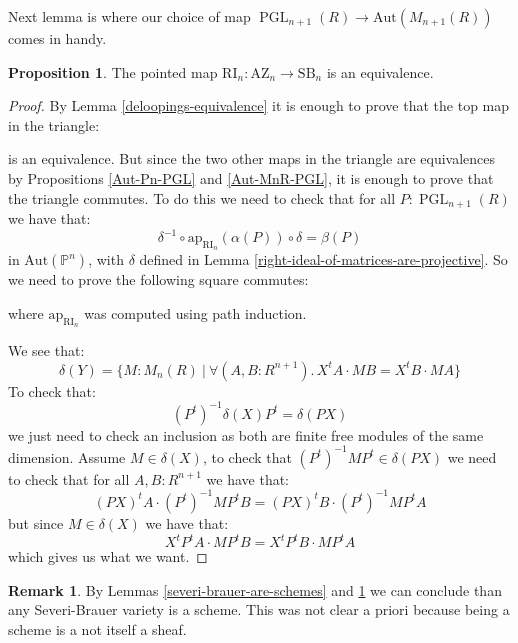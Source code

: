 \documentclass[10pt,a4paper]{article}
\theoremstyle{definition}
\newtheorem{remark}[theorem]{Remark}
\newtheorem{proposition}[theorem]{Proposition}
\DeclareMathOperator{\PGL}{PGL}
\newcommand{\SB}{\mathrm{SB}}
\newcommand{\RI}{\mathrm{RI}}
\newcommand{\AZ}{\mathrm{AZ}}
\newcommand{\bP}{\mathbb{P}}
\newcommand{\Aut}{\mathrm{Aut}}
\begin{document}
Next lemma is where our choice of map $\PGL_{n+1}(R)\to \Aut(M_{n+1}(R))$ comes in handy.

\begin{proposition}\label{right-ideal-is-equivalence}
The pointed map $\RI_n:\AZ_n\to\SB_n$ is an equivalence.
\end{proposition}

\begin{proof}
By Lemma \ref{deloopings-equivalence} it is enough to prove that the top map in the triangle:
\begin{center}
\end{center}
is an equivalence. But since the two other maps in the triangle are equivalences by Propositions \ref{Aut-Pn-PGL} and \ref{Aut-MnR-PGL}, it is enough to prove that the triangle commutes. To do this we need to check that for all $P:\PGL_{n+1}(R)$ we have that:
\[\delta^{-1}\circ \mathrm{ap}_{\RI_n}(\alpha(P))\circ\delta = \beta(P)\]
in $\Aut(\bP^n)$, with $\delta$ defined in Lemma \ref{right-ideal-of-matrices-are-projective}. So we need to prove the following square commutes:
\begin{center}
\end{center}
where $\mathrm{ap}_{\RI_n}$ was computed using path induction.

We see that:
\[\delta(Y) = \{M:M_n(R)\ |\ \forall (A,B:R^{n+1}).\, X^tA\cdot MB = X^tB\cdot MA\}\]
To check that:
\[(P^t)^{-1}\delta(X)P^t = \delta(PX)\]
we just need to check an inclusion as both are finite free modules of the same dimension. Assume $M\in\delta(X)$, to check that $(P^t)^{-1}MP^t\in\delta(PX)$ we need to check that for all $A,B:R^{n+1}$ we have that:
\[(PX)^tA \cdot (P^t)^{-1}MP^tB = (PX)^tB \cdot (P^t)^{-1}MP^tA \]
but since $M\in\delta(X)$ we have that:
\[X^tP^tA \cdot MP^tB = X^tP^tB\cdot MP^tA \]
which gives us what we want.
\end{proof}

\begin{remark}
By Lemmas \ref{severi-brauer-are-schemes} and \ref{right-ideal-is-equivalence} we can conclude than any Severi-Brauer variety is a scheme. This was not clear a priori because being a scheme is a not itself a sheaf.
\end{remark}
\end{document}

